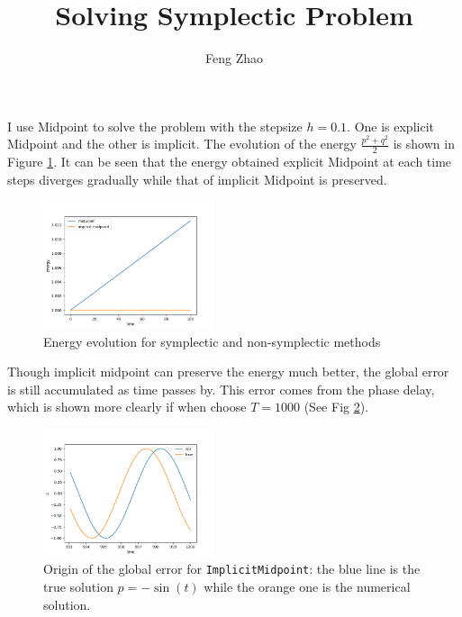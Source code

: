\documentclass{article}
\title{Solving Symplectic Problem}
\author{Feng Zhao}
\begin{document}
\maketitle
I use Midpoint to solve the problem with the stepsize $h=0.1$.
One is explicit Midpoint and the other is implicit.
The evolution of the energy $\frac{p^2+q^2}{2}$ is shown in
Figure \ref{fig:e}. It can be seen that
the energy obtained explicit Midpoint at each time steps diverges gradually
while that of implicit Midpoint is preserved.
\begin{figure}[!ht]
    \centering
    \includegraphics[width=5cm]{energy.png}
    \caption{Energy evolution for symplectic and non-symplectic methods}
    \label{fig:e}
\end{figure}
Though implicit midpoint can preserve the energy much better,
the global error is still accumulated as time passes by.
This error comes from the phase delay, which is shown more clearly
if when choose $T=1000$ (See Fig \ref{fig:o}).

\begin{figure}[!ht]
    \centering
    \includegraphics[width=5cm]{phase_delay.png}
    \caption{Origin of the global error for \texttt{ImplicitMidpoint}:
    the blue line is the true solution $p=-\sin(t)$ while
    the orange one is the numerical solution.}
    \label{fig:o}
\end{figure}
\end{document}
